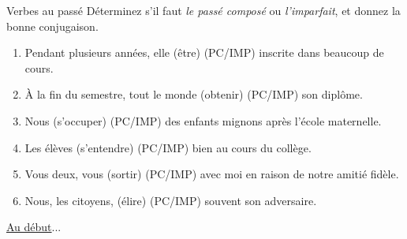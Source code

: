 \begin{frame}{Verbes au passé}
  \small
  Déterminez s'il faut \emph{le passé composé} ou \emph{l'imparfait}, et donnez la bonne conjugaison.
  \begin{enumerate}
    \item Pendant plusieurs années, elle \underline{} (être) (PC/\alert<2->{IMP}) inscrite dans beaucoup de cours.
    \item À la fin du semestre, tout le monde \underline{} (obtenir) (\alert<3->{PC}/IMP) son diplôme.
    \item Nous \underline{} (s'occuper) (\alert<4->{PC}/IMP) des enfants mignons après l'école maternelle.
    \item Les élèves \underline{} (s'entendre) (PC/\alert<5->{IMP}) bien au cours du collège.
    \item Vous deux, vous \underline{} (sortir) (\alert<6->{PC}/IMP) avec moi en raison de notre amitié fidèle.
    \item Nous, les citoyens, \underline{} (élire) (PC/\alert<7->{IMP}) souvent son adversaire.
  \end{enumerate}
  \raggedleft\raggedleft\hyperlink{début}{Au début}...
\end{frame}